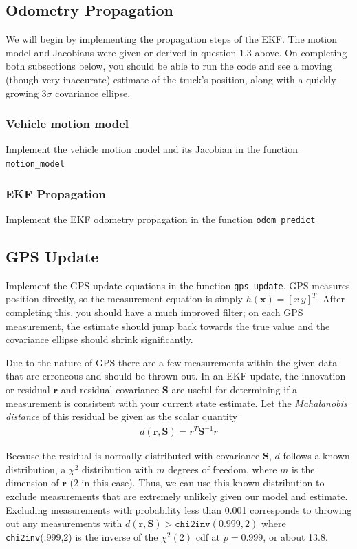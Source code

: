 \documentclass{article}
\newcommand{\mat}[1]{\bm{#1}}
\begin{document}
\subsection{Odometry Propagation}
We will begin by implementing the propagation steps of the EKF.
The motion model and Jacobians were given or derived in question 1.3 above.
On completing both subsections below, you should be able to run the code and see a moving (though very inaccurate) estimate of the truck's position, along with a quickly growing $3\sigma$ covariance ellipse.

\subsubsection{Vehicle motion model}
Implement the vehicle motion model and its Jacobian in the function \texttt{motion\_model}

\subsubsection{EKF Propagation}
Implement the EKF odometry propagation in the function \texttt{odom\_predict}

\subsection{GPS Update}
Implement the GPS update equations in the function \texttt{gps\_update}.
GPS measures position directly, so the measurement equation is simply $h(\mat{x}) = [ x \ y ]^T$.
After completing this, you should have a much improved filter; on each GPS measurement, the estimate should jump back towards the true value and the covariance ellipse should shrink significantly.

Due to the nature of GPS there are a few measurements within the given data that are erroneous and should be thrown out.
In an EKF update, the innovation or residual $\mat{r}$ and residual covariance $\mat{S}$ are useful for determining if a measurement is consistent with your current state estimate.
Let the \emph{Mahalanobis distance} of this residual be given as the scalar quantity
\begin{align}
    d(\mat{r}, \mat{S}) = r^T \mat{S}^{-1} r
\end{align}

Because the residual is normally distributed with covariance $\mat{S}$, $d$ follows a known distribution, a $\chi^2$ distribution with $m$ degrees of freedom, where $m$ is the dimension of $\mat{r}$ (2 in this case).
Thus, we can use this known distribution to exclude measurements that are extremely unlikely given our model and estimate.
Excluding measurements with probability less than 0.001 corresponds to throwing out any measurements with $d(\mat{r}, \mat{S}) > \texttt{chi2inv}(0.999, 2)$ where \texttt{chi2inv}(.999,2) is the inverse of the $\chi^2(2)$ cdf at $p = 0.999$, or about 13.8.
\end{document}
